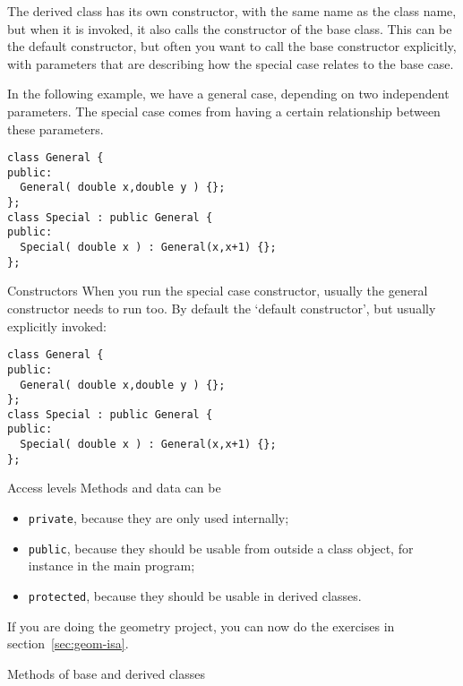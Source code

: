 The derived class has its own constructor, with the same name as the
class name, but when it is invoked, it also calls the constructor of
the base class. This can be the default constructor, but often you
want to call the base constructor explicitly, with parameters that are
describing how the special case relates to the base case.

In the following example, we have a general case, depending on two
independent parameters.
The special case comes from having a certain relationship between
these parameters.

\begin{lstlisting}
class General {
public:
  General( double x,double y ) {};
};
class Special : public General {
public:
  Special( double x ) : General(x,x+1) {};
};
\end{lstlisting}

\begin{slide}{Constructors}
  \label{sl:obj-derive-construct}
  When you run the special case constructor, usually the general
  constructor needs to run too. By default the `default constructor',
  but usually explicitly invoked:
  \lstset{style=snippetcode}
\begin{lstlisting}
class General {
public:
  General( double x,double y ) {};
};
class Special : public General {
public:
  Special( double x ) : General(x,x+1) {};
};
\end{lstlisting}
\end{slide}

\begin{block}{Access levels}
  \label{sl:private-etc}
  Methods and data can be
  \begin{itemize}
  \item \lstinline{private}, because they are only used internally;
  \item \lstinline{public}, because they should be usable from outside a class
    object, for instance in the main program;
  \item \lstinline{protected}, because they should be usable in derived classes.
  \end{itemize}
\end{block}

\begin{exercise}
  If you are doing the geometry project, 
  you can now do the exercises in section~\ref{sec:geom-isa}.
\end{exercise}

 {Methods of base and derived classes}
\label{sec:derive-method}

